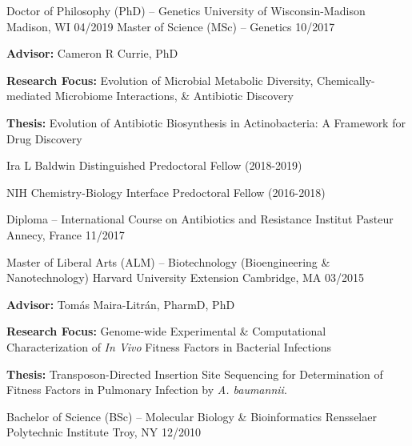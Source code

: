 {}

\begin{cventries}
\cventry
	{Doctor of Philosophy (PhD) -- Genetics}
	{University of Wisconsin-Madison}
	{Madison, WI}
	{04/2019}
	{}
	\vspace{-0.4cm}
\cventry
	{Master of Science (MSc) -- Genetics}
	{}
	{}
	{10/2017}
	{
      \begin{cvitems}
      	\item {\textbf{Advisor:} Cameron R Currie, PhD}
      	\item {\textbf{Research Focus:} Evolution of Microbial Metabolic Diversity, Chemically-mediated Microbiome Interactions, \& Antibiotic Discovery}
      	\item {\textbf{Thesis:} Evolution of Antibiotic Biosynthesis in Actinobacteria: A Framework for Drug Discovery}
      	\item {Ira L Baldwin Distinguished Predoctoral Fellow (2018-2019)}
      	\item {NIH Chemistry-Biology Interface Predoctoral Fellow (2016-2018)}
      \end{cvitems}
    }
    
\cventry
	{Diploma -- International Course on Antibiotics and Resistance}
	{Institut Pasteur}
	{Annecy, France}
	{11/2017}
	{} \vspace{-4mm}
    
\cventry
	{Master of Liberal Arts (ALM) -- Biotechnology (Bioengineering \& Nanotechnology)}
	{Harvard University Extension}
	{Cambridge, MA}
	{03/2015}
	{
      \begin{cvitems}
      	\item {\textbf{Advisor:} Tom\'{a}s Maira-Litr\'{a}n, PharmD, PhD}
      	\item {\textbf{Research Focus:} Genome-wide Experimental \& Computational Characterization of \textit{In Vivo} Fitness Factors in Bacterial Infections}
      	\item {\textbf{Thesis:} Transposon-Directed Insertion Site Sequencing for Determination of Fitness Factors in Pulmonary Infection by \textit{A. baumannii}.}
      \end{cvitems}
    }

\cventry
	{Bachelor of Science (BSc) -- Molecular Biology \& Bioinformatics}
	{Rensselaer Polytechnic Institute}
	{Troy, NY}
	{12/2010}
	{}
\end{cventries}

\vspace{-7mm}